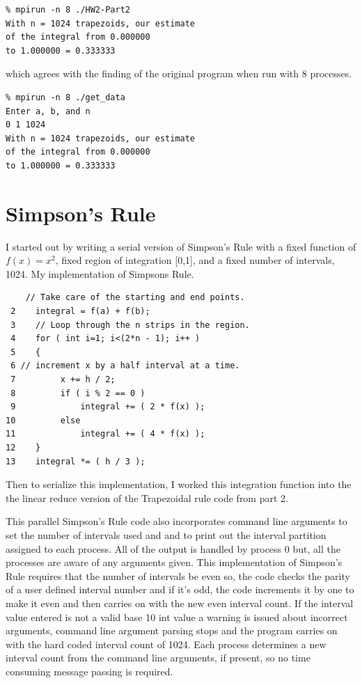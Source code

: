 \documentclass{IEEEtran}
\begin{document}
\begin{verbatim}
% mpirun -n 8 ./HW2-Part2 
With n = 1024 trapezoids, our estimate 
of the integral from 0.000000 
to 1.000000 = 0.333333
\end{verbatim}

which agrees with the finding of the original program when run with 8 processes.

\begin{verbatim}
% mpirun -n 8 ./get_data  
Enter a, b, and n 
0 1 1024 
With n = 1024 trapezoids, our estimate 
of the integral from 0.000000 
to 1.000000 = 0.333333
\end{verbatim}

\section{Simpson's Rule}
I started out by writing a serial version of Simpson’s Rule with a fixed function of $f(x) = x^{2}$, fixed region of integration [0,1], and a fixed number of intervals, 1024.  My implementation of Simpsons Rule.

\begin{verbatim}
    // Take care of the starting and end points. 
 2    integral = f(a) + f(b); 
 3    // Loop through the n strips in the region. 
 4    for ( int i=1; i<(2*n - 1); i++ ) 
 5    { 
 6 // increment x by a half interval at a time.
 7         x += h / 2; 
 8         if ( i % 2 == 0 ) 
 9             integral += ( 2 * f(x) ); 
10         else  
11             integral += ( 4 * f(x) ); 
12    } 
13    integral *= ( h / 3 );
\end{verbatim}

Then to serialize this implementation, I worked this integration function into the the linear reduce version of the Trapezoidal rule code from part 2. 

This parallel Simpson’s Rule code also incorporates command line arguments to set the number of intervals used and and to print out the interval partition assigned to each process. All of the output is handled by process 0 but, all the processes are aware of any arguments given.  This implementation of Simpson's Rule requires that the number of intervals be even so, the code checks the parity of a user defined interval number and if it’s odd, the code increments it by one to make it even and then carries on with the new even interval count. If the interval value entered is not a valid base 10 int value a warning is issued about incorrect arguments, command line argument parsing stops and the program carries on with the hard coded interval count of 1024. Each process determines a new interval count from the command line arguments, if present, so no time consuming message passing is required. 
\end{document}
